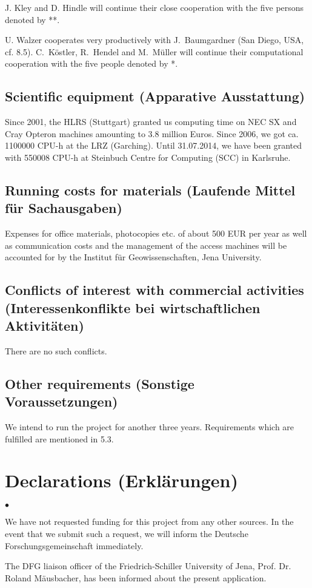 \documentclass[twoside,10pt]{article}
\newenvironment{dlist}
   {\begin{list}
      {$\bullet$}
      {
      \setlength{\topsep}{0.5ex}
      \setlength{\partopsep}{0.0ex}
      \setlength{\parsep}{0.5ex}
      \setlength{\itemsep}{0.0ex}
      \setlength{\itemindent}{3.0ex}
      \setlength{\leftmargin}{0.0ex}
      \setlength{\labelsep}{1.0ex}
      }
   }
   {\end{list}}
\begin{document}
\noindent
J. Kley and D. Hindle will continue their close cooperation with the five persons denoted by **.

\noindent
U. Walzer cooperates very productively with J.~Baumgardner (San Diego, USA, cf. 8.5).
C.~K\"ostler, R.~Hendel and M.~M\"uller will continue their computational cooperation with the five people denoted by *.

\subsection{Scientific equipment (Apparative Ausstattung)}
Since 2001, the HLRS (Stuttgart) granted us computing time on NEC SX and Cray Opteron machines amounting to 3.8 million Euros. 
Since 2006, we got ca. 1100000 CPU-h at the LRZ (Garching). 
Until 31.07.2014, we have been granted with 550008 CPU-h at Steinbuch Centre for Computing (SCC) in Karlsruhe.

\subsection{Running costs for materials (Laufende Mittel f\"ur Sachausgaben)}
Expenses for office materials, photocopies etc. of about 500 EUR per year 
as well as communication costs and the management of the access machines
will be accounted for by the Institut f\"ur Geowissenschaften, Jena University.

\subsection{Conflicts of interest with commercial activities \\
   (Interessenkonflikte bei wirtschaftlichen Aktivit\"aten)}
There are no such conflicts.

\subsection{Other requirements (Sonstige Voraussetzungen)}
We intend to run the project for another three years. 
Requirements which are fulfilled are mentioned in 5.3.

%
%

\section{Declarations (Erkl\"arungen)}
\begin{dlist}
\item We have not requested funding for this project from any other sources. 
   In the event that we submit such a request, we will inform the Deutsche Forschungsgemeinschaft immediately.
\item The DFG liaison officer of the Friedrich-Schiller University of Jena, Prof. Dr. Roland M\"ausbacher, has been informed about the present application.
\end{dlist}
\end{document}
